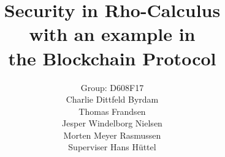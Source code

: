 \mainmatter  %

\title{Security in Rho-Calculus\\with an example in\\the Blockchain Protocol}




\author{Group: D608F17\\Charlie Dittfeld Byrdam\\Thomas Frandsen\\Jesper Windelborg Nielsen\\Morten Meyer Rasmussen\\Superviser Hans Hüttel}




\toctitle{}
\tocauthor{}
\maketitle

\begin{abstract}

\end{abstract}
